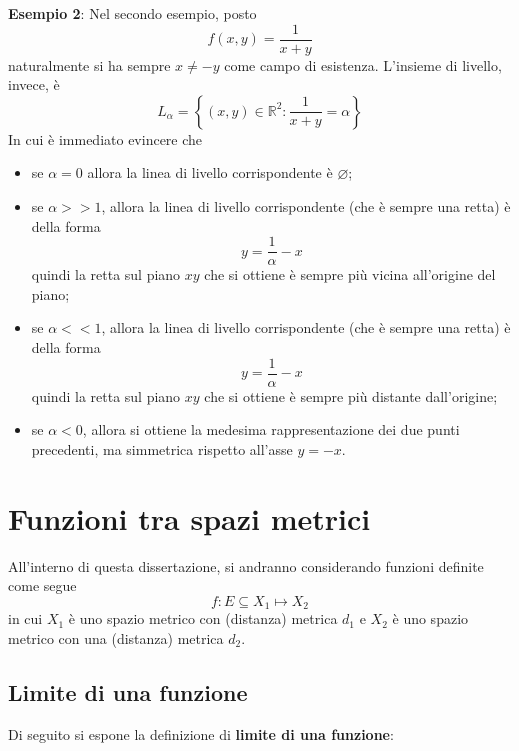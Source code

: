 \documentclass[a4paper]{extarticle}
\begin{document}
\vspace{2em}
\noindent
\textbf{Esempio 2}: Nel secondo esempio, posto
\[f(x,y)=\frac{1}{x+y}\]
naturalmente si ha sempre $x \neq -y$ come campo di esistenza. L'insieme di livello, invece, è
\[L_\alpha = \left\{(x,y) \in \mathbb{R}^2 : \frac{1}{x+y}=\alpha\right\}\]
In cui è immediato evincere che
\begin{itemize}
    \item se $\alpha=0$ allora la linea di livello corrispondente è $\varnothing$;
    \item se $\alpha>>1$, allora la linea di livello corrispondente (che è sempre una retta) è della forma
    \[y=\dfrac{1}{\alpha} - x\]
    quindi la retta sul piano $xy$ che si ottiene è sempre più vicina all'origine del piano;
    \item se $\alpha<<1$, allora la linea di livello corrispondente (che è sempre una retta) è della forma
    \[y=\dfrac{1}{\alpha} - x\]
    quindi la retta sul piano $xy$ che si ottiene è sempre più distante dall'origine;
    \item se $\alpha<0$, allora si ottiene la medesima rappresentazione dei due punti precedenti, ma simmetrica rispetto all'asse $y=-x$.
\end{itemize}

\newpage
\section{Funzioni tra spazi metrici}
All'interno di questa dissertazione, si andranno considerando funzioni definite come segue
\[f : E \subseteq X_1 \longmapsto X_2\]
in cui $X_1$ è uno spazio metrico con (distanza) metrica $d_1$ e $X_2$ è uno spazio metrico con una (distanza) metrica $d_2$.

\vspace{1em}
\noindent
\subsection{Limite di una funzione}
Di seguito si espone la definizione di \textbf{limite di una funzione}:
\end{document}
